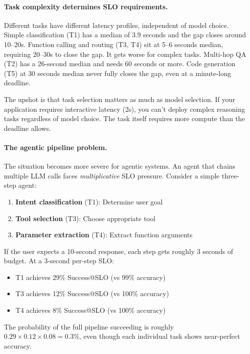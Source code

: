\documentclass[11pt]{article}
\begin{document}
\paragraph{Task complexity determines SLO requirements.}
Different tasks have different latency profiles, independent of model choice.
Simple classification (T1) has a median of 3.9 seconds and the gap closes around 10--20s.
Function calling and routing (T3, T4) sit at 5--6 seconds median, requiring 20--30s to close the gap.
It gets worse for complex tasks.  Multi-hop QA (T2) has a 26-second median and needs 60 seconds or more.  Code generation (T5) at 30 seconds median never fully closes the gap, even at a minute-long deadline.

The upshot is that task selection matters as much as model selection.
If your application requires interactive latency (2s), you can't deploy complex reasoning tasks regardless of model choice.  The task itself requires more compute than the deadline allows.

\paragraph{The agentic pipeline problem.}
The situation becomes more severe for agentic systems.
An agent that chains multiple LLM calls faces \emph{multiplicative} SLO pressure.
Consider a simple three-step agent:

\begin{enumerate}[leftmargin=12pt]
    \item \textbf{Intent classification} (T1): Determine user goal
    \item \textbf{Tool selection} (T3): Choose appropriate tool
    \item \textbf{Parameter extraction} (T4): Extract function arguments
\end{enumerate}

If the user expects a 10-second response, each step gets roughly 3 seconds of budget.
At a 3-second per-step SLO:
\begin{itemize}[leftmargin=12pt]
    \item T1 achieves 29\% Success@SLO (vs 99\% accuracy)
    \item T3 achieves 12\% Success@SLO (vs 100\% accuracy)
    \item T4 achieves 8\% Success@SLO (vs 100\% accuracy)
\end{itemize}

The probability of the full pipeline succeeding is roughly $0.29 \times 0.12 \times 0.08 = 0.3\%$, even though each individual task shows near-perfect accuracy.
\end{document}
